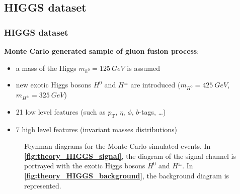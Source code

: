 \documentclass[xcolor=table,8pt]{beamer}
\begin{document}
    \subsection{HIGGS dataset}
    \begin{frame}[t]
        \frametitle{HIGGS dataset}
        
        \textbf{Monte Carlo generated sample of gluon fusion process}:
        \begin{itemize}
            \item a mass of the Higgs \( m_{h^{0}} = 125 \ \si{GeV} \) is assumed
            \item \alert{new exotic Higgs bosons \( H^{0} \) and \( H^{\pm} \)} are introduced (\( m_{H^{0}} = 425 \ \si{GeV} \), \( m_{H^{\pm}} = 325 \ \si{GeV} \))
            \item \alert{21 low level features} (such as \( p_{\text{T}} \), \( \eta \), \( \phi \), \( b \)-tags, \dots)
            \item \alert{7 high level features} (invariant masses distributions)
        \end{itemize}
        
        \begin{figure}[!h]
            \begin{minipage}[c]{0.50\linewidth}
                \vspace{0pt}
                \centering
            \end{minipage}%
            \begin{minipage}[c]{0.50\linewidth}
                \vspace{0pt}
                \centering
            \end{minipage}%
            \caption{Feynman diagrams for the Monte Carlo simulated events. In \textbf{\ref{fig:theory_HIGGS_signal}}, the diagram of the signal channel is portrayed with the exotic Higgs bosons \( H^{0} \) and \( H^{\pm} \). In \textbf{\ref{fig:theory_HIGGS_background}}, the background diagram is represented.}
            \label{fig:theory_HIGGS_feynman}
        \end{figure}
        

\end{frame}
\end{document}
